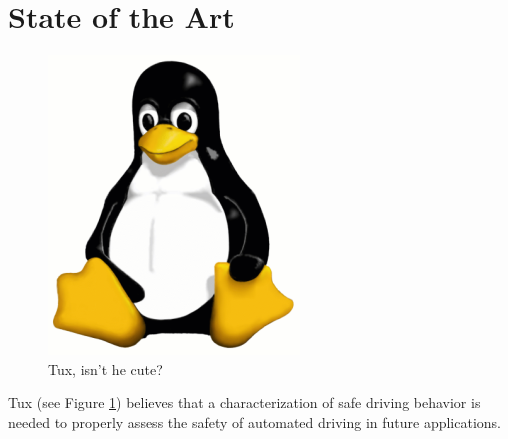 \section{State of the Art}
\label{sec:state_of_the_art}

\begin{figure}
\includegraphics[width=0.60\linewidth]{figs/tux}
\caption{Tux, isn't he cute?}
\label{fig:tux}
\end{figure}

Tux (see Figure \ref{fig:tux}) believes that a characterization of safe driving behavior \cite{tejada2020safe} is needed to properly assess the safety of automated driving in future applications.
